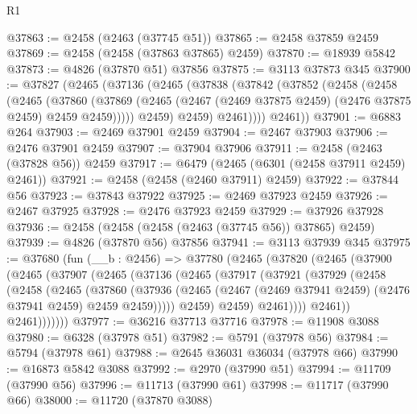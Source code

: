 \begin{lexlean}{R1}
\begin{coremodule}
@37863 := @2458 (@2463 (@37745 @51))
@37865 := @2458 @37859 @2459
@37869 := @2458 (@2458 (@37863 @37865) @2459)
@37870 := @18939 @5842
@37873 := @4826 (@37870 @51) @37856
@37875 := @3113 @37873 @345
@37900 := @37827
    (@2465
      (@37136
        (@2465
          (@37838
            (@37842
              (@37852
                (@2458
                  (@2458
                    (@2465
                      (@37860
                        (@37869
                          (@2465 (@2467 (@2469 @37875 @2459) (@2476 @37875 @2459) @2459 @2459)))))
                    @2459)
                  @2459)
                @2461))))
        @2461))
@37901 := @6883 @264
@37903 := @2469 @37901 @2459
@37904 := @2467 @37903
@37906 := @2476 @37901 @2459
@37907 := @37904 @37906
@37911 := @2458 (@2463 (@37828 @56)) @2459
@37917 := @6479 (@2465 (@6301 (@2458 @37911 @2459) @2461))
@37921 := @2458 (@2458 (@2460 @37911) @2459)
@37922 := @37844 @56
@37923 := @37843 @37922
@37925 := @2469 @37923 @2459
@37926 := @2467 @37925
@37928 := @2476 @37923 @2459
@37929 := @37926 @37928
@37936 := @2458 (@2458 (@2458 (@2463 (@37745 @56)) @37865) @2459)
@37939 := @4826 (@37870 @56) @37856
@37941 := @3113 @37939 @345
@37975 := @37680
    (fun (__b : @2456) =>
    @37780
      (@2465
        (@37820
          (@2465
            (@37900
              (@2465
                (@37907
                  (@2465
                    (@37136
                      (@2465
                        (@37917
                          (@37921
                            (@37929
                              (@2458
                                (@2458
                                  (@2465
                                    (@37860
                                      (@37936
                                        (@2465
                                          (@2467
                                            (@2469 @37941 @2459)
                                            (@2476 @37941 @2459)
                                            @2459
                                            @2459)))))
                                  @2459)
                                @2459)
                              @2461))))
                      @2461))
                  @2461)))))))
@37977 := @36216 @37713 @37716
@37978 := @11908 @3088
@37980 := @6328 (@37978 @51)
@37982 := @5791 (@37978 @56)
@37984 := @5794 (@37978 @61)
@37988 := @2645 @36031 @36034 (@37978 @66)
@37990 := @16873 @5842 @3088
@37992 := @2970 (@37990 @51)
@37994 := @11709 (@37990 @56)
@37996 := @11713 (@37990 @61)
@37998 := @11717 (@37990 @66)
@38000 := @11720 (@37870 @3088)

\end{coremodule}
\end{lexlean}
